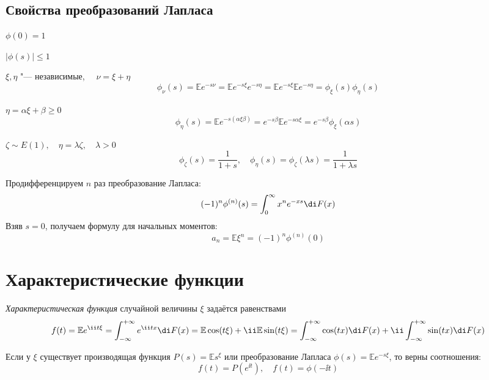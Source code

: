 \subsection{Свойства преобразований Лапласа}

\begin{props}
\item $ \phi(0) = 1 $
\item $ |\phi(s)| \le 1 $
\item $ \xi, \eta $ "--- независимые, $ \quad \nu = \xi + \eta $
    $$ \phi_\nu(s) = \mathbb Ee^{-s\nu} = \mathbb E e^{-s\xi}e^{-s\eta} =
    \mathbb E e^{-s\xi} \mathbb E e^{-s\eta} = \phi_\xi(s) \phi_\eta(s) $$
\item $ \eta = \alpha\xi + \beta \ge 0 $
    $$ \phi_\eta(s) = \mathbb Ee^{-s(\alpha \xi \beta)} = e^{-s\beta} \mathbb E e^{-s\alpha \xi} =
    e^{-s\beta} \phi_\xi(\alpha s) $$

    $ \zeta \sim E(1), \quad \eta = \lambda \zeta, \quad \lambda > 0 $
    $$ \phi_\zeta(s) = \frac1{1 + s}, \quad \phi_\eta(s) = \phi_\zeta(\lambda s) =
    \frac1{1 + \lambda s} $$
\item Продифференцируем $ n $ раз преобразование Лапласа:
    $$ (-1)^n \phi^{(n)}(s) = \int_0^\infty x^n e^{-xs} \di F(x) $$
    Взяв $ s = 0 $, получаем формулу для начальных моментов:
    $$ a_n = \mathbb E \xi^n = (-1)^n \phi^{(n)}(0) $$
\end{props}

\section{Характеристические функции}

\begin{definition}
    \emph{Характеристическая функция} случайной величины $ \xi $ задаётся равенствами
    $$ f(t) = \mathbb E e^{\ii t\xi} = \int_{-\infty}^{+\infty} e^{\ii tx} \di F(x) =
    \mathbb E \cos(t\xi) + \ii \mathbb E \sin(t\xi) =
    \int_{-\infty}^{+\infty} \cos(tx) \di F(x) + \ii \int_{-\infty}^{+\infty} \sin(tx) \di F(x) $$
\end{definition}

Если у $ \xi $ существует производящая функция $ P(s) = \mathbb E s^\xi $ или преобразование
Лапласа $ \phi(s) = \mathbb E e^{-s\xi} $, то верны соотношения:
$$ f(t) = P(e^{\ii t}), \quad f(t) = \phi(-\ii t) $$

